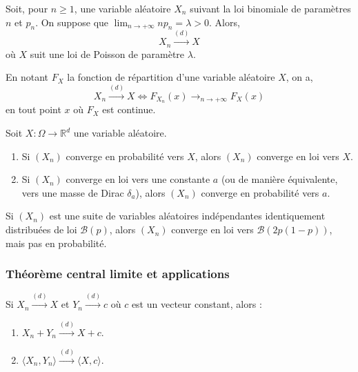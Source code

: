   \begin{application}
    Soit, pour $n \geq 1$, une variable aléatoire $X_n$ suivant la loi binomiale de paramètres $n$ et $p_n$. On suppose que $\lim_{n \rightarrow +\infty} n p_n = \lambda > 0$.
    Alors,
    \[ X_n \overset{(d)}{\longrightarrow} X \]
    où $X$ suit une loi de Poisson de paramètre $\lambda$.
  \end{application}


  \begin{theorem}
    En notant $F_X$ la fonction de répartition d'une variable aléatoire $X$, on a,
    \[ X_n \overset{(d)}{\longrightarrow} X \iff F_{X_n}(x) \longrightarrow_{n \rightarrow +\infty} F_X(x) \]
    en tout point $x$ où $F_X$ est continue.
  \end{theorem}

  \begin{theorem}
    Soit $X : \Omega \rightarrow \mathbb{R}^d$ une variable aléatoire.
    \begin{enumerate}[label={\bfseries(\roman*)}]
      \item Si $(X_n)$ converge en probabilité vers $X$, alors $(X_n)$ converge en loi vers $X$.
      \item Si $(X_n)$ converge en loi vers une constante $a$ (ou de manière équivalente, vers une masse de Dirac $\delta_a$), alors $(X_n)$ converge en probabilité vers $a$.
    \end{enumerate}
  \end{theorem}


  \begin{cexample}
    Si $(X_n)$ est une suite de variables aléatoires indépendantes identiquement distribuées de loi $\mathcal{B}(p)$, alors $(X_n)$ converge en loi vers $\mathcal{B}(2p(1-p))$, mais pas en probabilité.
  \end{cexample}

  \subsubsection{Théorème central limite et applications}


  \begin{theorem}
    Si $X_n \overset{(d)}{\longrightarrow} X$ et $Y_n \overset{(d)}{\longrightarrow} c$ où $c$ est un vecteur constant, alors :
    \begin{enumerate}[label={\bfseries(\roman*)}]
      \item $X_n + Y_n \overset{(d)}{\longrightarrow} X + c$.
      \item $\langle X_n, Y_n \rangle \overset{(d)}{\longrightarrow} \langle X, c \rangle$.
    \end{enumerate}
  \end{theorem}

